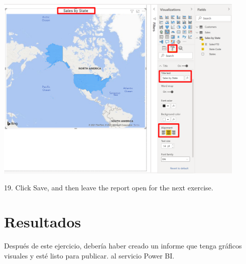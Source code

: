 \documentclass[12pt,letterpaper]{article}
\begin{document}
\begin{center}
    \includegraphics[width=12cm]{img/112.png}
\end{center}
19. Click Save, and then leave the report open for the next exercise.

\section{Resultados}
Después de este ejercicio, debería haber creado un informe que tenga gráficos visuales y esté listo para publicar.
al servicio Power BI.
\end{document}
